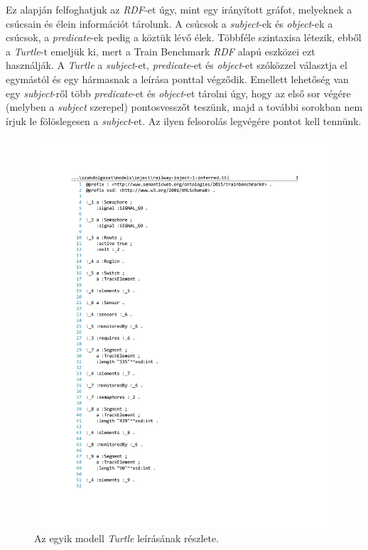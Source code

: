 Ez alapján felfoghatjuk az \emph{RDF}-et úgy, mint egy irányított gráfot, melyeknek a csúcsain és élein információt tárolunk. A csúcsok a \emph{subject}-ek és \emph{object}-ek a csúcsok, a \emph{predicate}-ek pedig a köztük lévő élek. Többféle szintaxisa létezik, ebből a \emph{Turtle}-t emeljük ki, mert a Train Benchmark \emph{RDF} alapú eszközei ezt használják. A \emph{Turtle} a \emph{subject}-et, \emph{predicate}-et és \emph{object}-et szóközzel választja el egymástól és egy hármasnak a leírása ponttal végződik.\cite{Prud'hommeaux:14:RT} Emellett lehetőség van egy \emph{subject}-ről több \emph{predicate}-et és \emph{object}-et tárolni úgy, hogy az első sor végére (melyben a \emph{subject} szerepel) pontosvesszőt teszünk, majd a további sorokban nem írjuk le fölöslegesen a \emph{subject}-et. Az ilyen felsorolás legvégére pontot kell tennünk.
\begin{figure}[H]
	\centering
	\includegraphics{figures/Turtle.pdf}
	\caption{Az egyik modell \emph{Turtle} leírásának részlete.}
	\label{fig:Turtle}
\end{figure}

